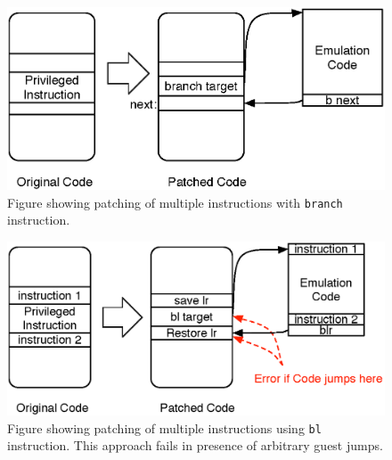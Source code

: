 \begin{figure}[!htb]
\centering

\includegraphics[scale=0.5]{txcache.eps}
\caption{\label{fig:txcache}Figure showing patching of multiple instructions with {\tt branch} instruction.}
\end{figure}

\begin{figure}[!htb]
\centering
\includegraphics[scale=0.5]{multiple_ins_patching.eps}
\caption{\label{fig:multiple_insns_patching}Figure showing patching of multiple instructions using {\tt bl} instruction. This approach fails in presence of arbitrary guest jumps.}
\end{figure}

